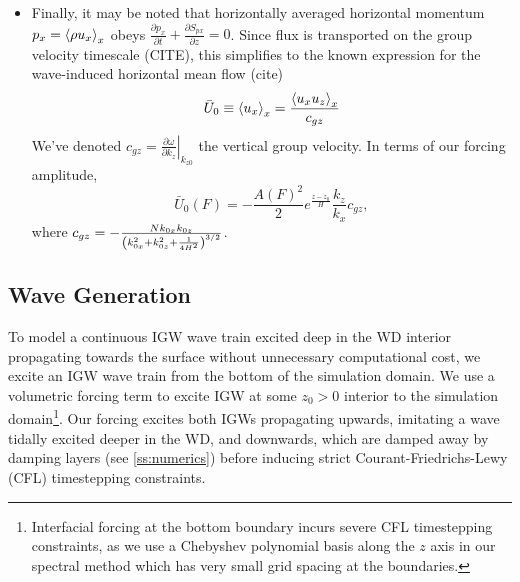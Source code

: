 \documentclass[twocolumn,
        nofootinbib,
        usenames, %
        dvipsnames %
    ]{revtex4-1}%
\newcommand*{\pd}[2]{\frac{\partial#1}{\partial#2}}
\newcommand*{\at}[1]{\left.#1\right|}
\DeclarePairedDelimiter\ev{\langle}{\rangle}
\DeclarePairedDelimiter\p{\lparen}{\rparen}
\begin{document}
\begin{itemize}
    \item Finally, it may be noted that horizontally averaged horizontal
        momentum $p_x = \ev*{\rho u_x}_x$ obeys $\pd{p_x}{t} + \pd{S_{px}}{z} =
        0$. Since flux is transported on the group velocity timescale (CITE),
        this simplifies to the known expression for the wave-induced horizontal
        mean flow (cite)
        \begin{equation}
            \bar{U}_0 \equiv \ev*{u_x}_x = \frac{\ev*{u_xu_z}_x}{c_{gz}}
        \end{equation}
        We've denoted $c_{gz} = \at{\pd{\omega}{k_{z}}}_{k_{z0}}$ the vertical group
        velocity. In terms of our forcing amplitude,
        \begin{equation}
            \bar{U}_0(F) = -\frac{A(F)^2}{2}e^{\frac{z - z_0}{H}} \frac{k_z}{k_x}c_{gz},
                \label{eq:u0_lin}
        \end{equation}
        where $c_{gz} = -\frac{Nk_{0x}k_{0z}}{\p*{k_{0x}^2 + k_{0z}^2 +
        \frac{1}{4H^2}}^{3/2}}$.
\end{itemize}
%

\subsection{Wave Generation}

To model a continuous IGW wave train excited deep in the WD interior propagating
towards the surface without unnecessary computational cost, we excite an
IGW wave train from the bottom of the simulation domain. We use a volumetric
forcing term to excite IGW at some $z_0 > 0$ interior to the simulation
domain\footnote{Interfacial forcing at the bottom boundary incurs severe CFL
timestepping constraints, as we use a Chebyshev polynomial basis along the $z$
axis in our spectral method which has very small grid spacing at the
boundaries.}. Our forcing excites both IGWs propagating upwards, imitating a
wave tidally excited deeper in the WD, and downwards, which are damped away by
damping layers (see \autoref{ss:numerics}) before inducing strict
Courant-Friedrichs-Lewy (CFL) timestepping constraints.
\end{document}
